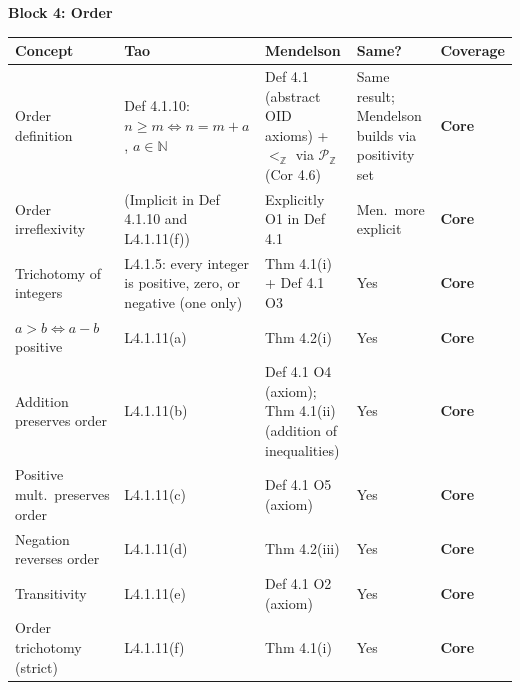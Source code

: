 \begin{exposition}
\bigskip
\end{exposition}

\noindent\textbf{Block 4: Order}

\begin{exposition}
\smallskip
\end{exposition}
\begin{tabular}{p{} p{} p{} p{} p{}}
\toprule
\textbf{Concept} & \textbf{Tao} & \textbf{Mendelson} & \textbf{Same?} & \textbf{Coverage} \\
\midrule

Order definition
& Def 4.1.10: $n\geq m\iff n=m+a$, $a\in\mathbb{N}$
& Def 4.1 (abstract OID axioms) + $<_\mathbb{Z}$ via $\mathcal{P}_\mathbb{Z}$ (Cor 4.6)
& Same result; Mendelson builds via positivity set
& \textbf{Core}
\\[6pt]

Order irreflexivity
& (Implicit in Def 4.1.10 and L4.1.11(f))
& Explicitly O1 in Def 4.1
& Men.\ more explicit
& \textbf{Core}
\\[6pt]

Trichotomy of integers
& L4.1.5: every integer is positive, zero, or negative (one only)
& Thm 4.1(i) + Def 4.1 O3
& Yes
& \textbf{Core}
\\[6pt]

$a>b \iff a-b$ positive
& L4.1.11(a)
& Thm 4.2(i)
& Yes
& \textbf{Core}
\\[6pt]

Addition preserves order
& L4.1.11(b)
& Def 4.1 O4 (axiom); Thm 4.1(ii) (addition of inequalities)
& Yes
& \textbf{Core}
\\[6pt]

Positive mult.\ preserves order
& L4.1.11(c)
& Def 4.1 O5 (axiom)
& Yes
& \textbf{Core}
\\[6pt]

Negation reverses order
& L4.1.11(d)
& Thm 4.2(iii)
& Yes
& \textbf{Core}
\\[6pt]

Transitivity
& L4.1.11(e)
& Def 4.1 O2 (axiom)
& Yes
& \textbf{Core}
\\[6pt]

Order trichotomy (strict)
& L4.1.11(f)
& Thm 4.1(i)
& Yes
& \textbf{Core}
\\[6pt]


\end{tabular}
